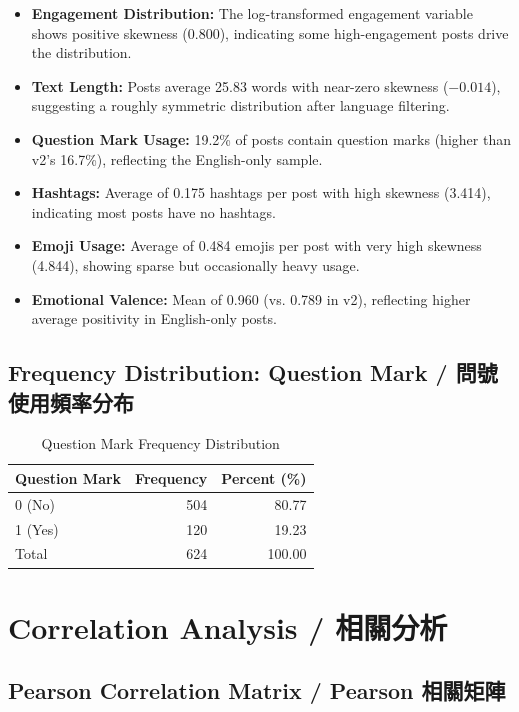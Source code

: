 \documentclass[12pt,a4paper]{article}
\begin{document}
\begin{itemize}
    \item \textbf{Engagement Distribution:} The log-transformed engagement variable shows positive skewness (0.800), indicating some high-engagement posts drive the distribution.
    \item \textbf{Text Length:} Posts average 25.83 words with near-zero skewness ($-0.014$), suggesting a roughly symmetric distribution after language filtering.
    \item \textbf{Question Mark Usage:} 19.2\% of posts contain question marks (higher than v2's 16.7\%), reflecting the English-only sample.
    \item \textbf{Hashtags:} Average of 0.175 hashtags per post with high skewness (3.414), indicating most posts have no hashtags.
    \item \textbf{Emoji Usage:} Average of 0.484 emojis per post with very high skewness (4.844), showing sparse but occasionally heavy usage.
    \item \textbf{Emotional Valence:} Mean of 0.960 (vs. 0.789 in v2), reflecting higher average positivity in English-only posts.
\end{itemize}

\subsection{Frequency Distribution: Question Mark / 問號使用頻率分布}

\begin{table}[H]
\centering
\caption{Question Mark Frequency Distribution}
\small
\begin{tabular}{lrr}
\toprule
Question Mark & Frequency & Percent (\%) \\
\midrule
0 (No) & 504 & 80.77 \\
1 (Yes) & 120 & 19.23 \\
\midrule
Total & 624 & 100.00 \\
\bottomrule
\end{tabular}
\end{table}

\newpage

\section{Correlation Analysis / 相關分析}

\subsection{Pearson Correlation Matrix / Pearson 相關矩陣}
\end{document}

